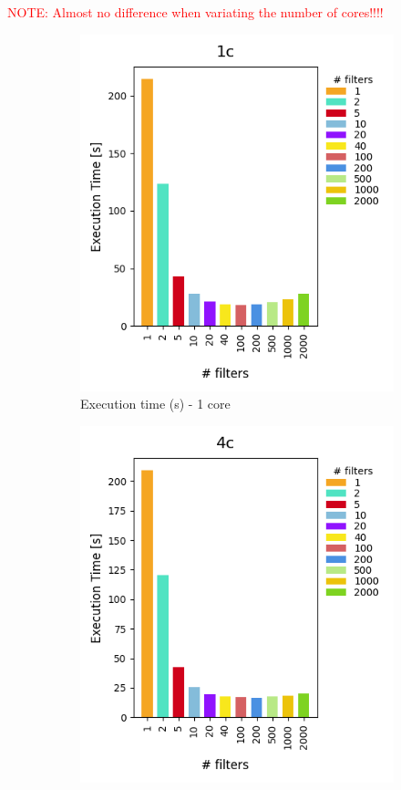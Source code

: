 \documentclass[12pt,a4paper]{article}
\begin{document}
\textcolor{red}{NOTE: Almost no difference when variating the number of cores!!!!}

\begin{figure}[H]
  \centering
  \begin{subfigure}[b]{0.45\textwidth}
    \centering
    \includegraphics[scale=0.6]{images/4-Experiments/E2/fixedcores/1c/execTime.png}
    \caption{Execution time (s) - 1 core}
  \end{subfigure}
  \hfill
  \begin{subfigure}[b]{0.45\textwidth}
    \centering
    \includegraphics[scale=0.6]{images/4-Experiments/E2/fixedcores/4c/execTime.png}

\end{subfigure}
\end{figure}
\end{document}
